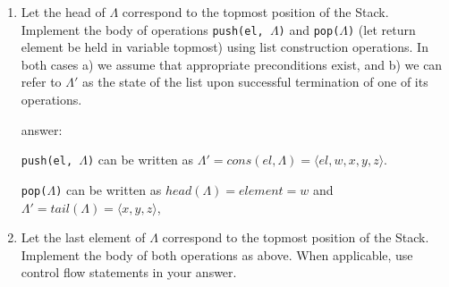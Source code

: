 \documentclass[12pt]{article}
\begin{document}
\begin{enumerate}

\item Let the head of $\Lambda$ correspond to the topmost position of the Stack. Implement the body of operations \texttt{push(el, $\Lambda$)} and \texttt{pop($\Lambda$)} (let return element be held in variable topmost) using list construction operations. In both cases a)  we assume that appropriate preconditions exist, and b) we can refer to $\Lambda'$ as the state of the list upon successful termination of one of its operations.

\noindent answer: 

\indent \texttt{push(el, $\Lambda$)}  can be written as $\Lambda' = cons( el, \Lambda) = \langle el, w, x, y, z \rangle$.


\indent \texttt{pop($\Lambda$)}  can be written as $head(\Lambda) = element = w$ and $\Lambda' = tail(\Lambda) = \langle x, y, z \rangle$,

\item  Let the last element of $\Lambda$ correspond to the topmost position of the Stack. Implement the body of both operations as above. When applicable, use control flow statements in your answer.

\end{enumerate}

\newpage
\end{document}
